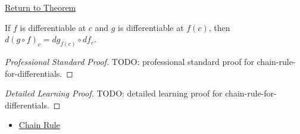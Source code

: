 \newpage
{}
\label{prf:chain-rule-for-differentials}

\begin{remark*}[Return]
\hyperref[thm:chain-rule-for-differentials]{Return to Theorem}
\end{remark*}

\begin{theorem*}
If $f$ is differentiable at $c$ and $g$ is differentiable at $f(c)$, then $d(g\circ f)_c=dg_{f(c)}\circ df_c$.
\end{theorem*}

\begin{proof}[Professional Standard Proof]
\LRAProofBodyStart
TODO: professional standard proof for chain-rule-for-differentials.
\end{proof}

\begin{proof}[Detailed Learning Proof]
\LRAProofBodyStart
TODO: detailed learning proof for chain-rule-for-differentials.
\end{proof}

\begin{remark*}
\end{remark*}

\begin{dependencies}
\begin{itemize}
  \item \hyperref[thm:chain-rule]{Chain Rule}
\end{itemize}
\end{dependencies}

\clearpage
